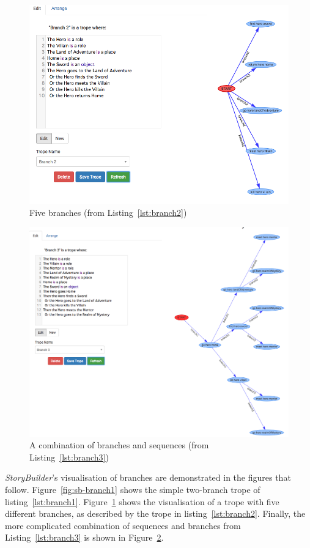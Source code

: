 \documentclass[11pt]{report}
\begin{document}
\begin{figure}[!h]
\centerline{\includegraphics[width=\textwidth]{storybuilder-branch2.png}}
\caption{Five branches (from Listing~\ref{lst:branch2})}\label{fig:sb-branch2}
\end{figure}

\begin{figure}[!h]
\centerline{\includegraphics[width=\textwidth]{storybuilder-branch3.png}}
\caption{A combination of branches and sequences (from Listing~\ref{lst:branch3})}\label{fig:sb-branch3}
\end{figure}

\emph{StoryBuilder}'s visualisation of branches are demonstrated in the figures
that follow. Figure~\ref{fig:sb-branch1} shows the simple two-branch trope of
listing~\ref{lst:branch1}. Figure~\ref{fig:sb-branch2} shows the visualisation
of a trope with five different branches, as described by the trope in
listing~\ref{lst:branch2}. Finally, the more complicated combination of
sequences and branches from Listing~\ref{lst:branch3} is shown in Figure~\ref{fig:sb-branch3}.
\end{document}
